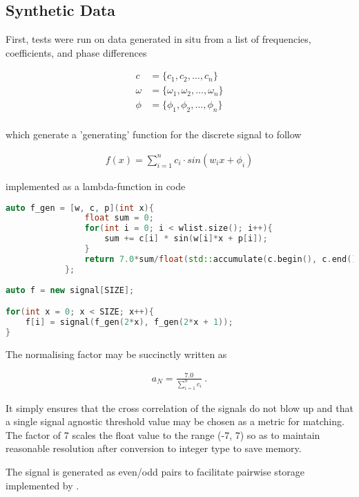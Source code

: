 \subsection{Synthetic Data}

First, tests were run on data generated in situ from a list of frequencies, coefficients, and phase differences

\begin{align*}
    c &= \{c_1, c_2, \ldots, c_n\}\\
    \omega &= \{\omega_1, \omega_2, \ldots, \omega_n\}\\
    \phi &= \{\phi_1, \phi_2, \ldots, \phi_n\}\\
\end{align*}

which generate a 'generating' function for the discrete signal to follow

\begin{align*}
    f(x) = \sum_{i = 1}^{n} c_i \cdot sin(w_i x + \phi_i)
\end{align*}

implemented as a lambda-function in code 

\begin{lstlisting}[language=C++]
auto f_gen = [w, c, p](int x){
                float sum = 0;
                for(int i = 0; i < wlist.size(); i++){
                    sum += c[i] * sin(w[i]*x + p[i]);
                }
                return 7.0*sum/float(std::accumulate(c.begin(), c.end(), 0));
            };
            
auto f = new signal[SIZE];

for(int x = 0; x < SIZE; x++){
    f[i] = signal(f_gen(2*x), f_gen(2*x + 1));
}
\end{lstlisting}

The normalising factor may be succinctly written as 

\begin{align*}
    a_N = \frac{7.0}{\sum_{i = 1}^{n}c_i}~.
\end{align*}

It simply ensures that the cross correlation of the signals do not blow up and
that a single signal agnostic threshold value may be chosen as a metric for
matching. The factor of 7 scales the float value to the range (-7, 7) so as to
maintain reasonable resolution after conversion to integer type to save memory.

The signal is generated as even/odd pairs to facilitate pairwise storage
implemented by .


